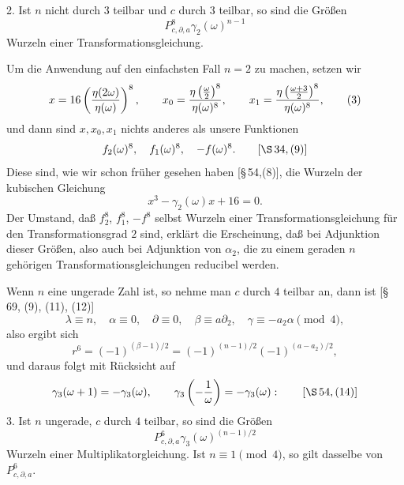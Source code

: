 \documentclass[11pt]{article}
\begin{document}
2. Ist $n$ nicht durch $3$ teilbar und $c$ durch $3$ teilbar, so sind die Größen
\[
 P_{c,\partial,a}^{8}\gamma_2(\omega)^{n-1}
\]
Wurzeln einer Transformationsgleichung.

Um die Anwendung auf den einfachsten Fall $n=2$ zu machen, setzen wir
\begin{equation}
 x=16\left({\eta(2\omega)\over\eta(\omega)}\right)^8,
 \qquad
 x_0={\eta\left({\omega\over2}\right)^8\over\eta(\omega)^8},
 \qquad
 x_1={\eta\left({\omega+3\over2}\right)^8\over\eta(\omega)^8},
\tag{3}
\end{equation}
und dann sind $x,x_0,x_1$ nichts anderes als unsere Funktionen
\[
 f_2(\omega)^8,
 \quad f_1(\omega)^8,
 \quad -f(\omega)^8.
 \qquad [\S\,34,(9)]
\]
Diese sind, wie wir schon früher gesehen haben [\S\,54,(8)], die Wurzeln der kubischen Gleichung
\begin{equation}
 x^3-\gamma_2(\omega)x+16=0.
\tag{4}
\end{equation}
Der Umstand, daß $f_2^8$, $f_1^8$, $-f^8$ selbst Wurzeln einer Transformationsgleichung für den Transformationsgrad $2$ sind, erklärt die Erscheinung, daß bei Adjunktion dieser Größen, also auch bei Adjunktion von $\alpha_2$, die zu einem geraden $n$ gehörigen Transformationsgleichungen reducibel werden.

Wenn $n$ eine ungerade Zahl ist, so nehme man $c$ durch $4$ teilbar an, dann ist [\S\,69, (9), (11), (12)]
\[
 \lambda\equiv n,
 \quad \alpha\equiv0,
 \quad \partial\equiv0,
 \quad \beta\equiv a\partial_2,
 \quad \gamma\equiv-a_2\alpha
 \pmod4,
\]
also ergibt sich
\[
 r^6=(-1)^{(\beta-1)/2}=(-1)^{(n-1)/2}(-1)^{(a-a_2)/2},
\]
und daraus folgt mit Rücksicht auf
\[
 \gamma_3(\omega+1)=-\gamma_3(\omega),
 \qquad
 \gamma_3\left(-{1\over\omega}\right)=-\gamma_3(\omega):
 \qquad [\S\,54,(14)]
\]
3. Ist $n$ ungerade, $c$ durch $4$ teilbar, so sind die Größen
\[
 P_{c,\partial,a}^{6}\gamma_3(\omega)^{(n-1)/2}
\]
Wurzeln einer Multiplikatorgleichung. Ist $n\equiv1\pmod4$, so gilt dasselbe von $P_{c,\partial,a}^{6}$.
\end{document}

